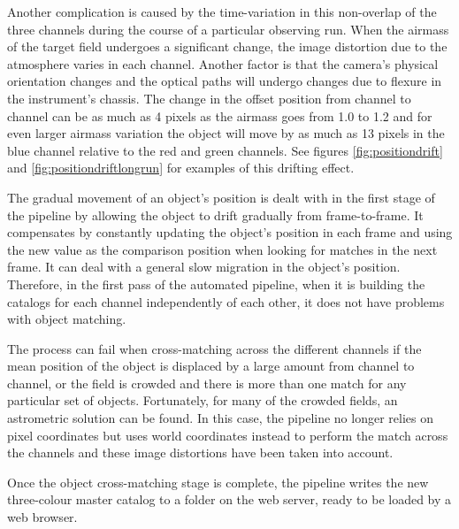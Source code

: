 Another complication is caused by the time-variation in this non-overlap of the three channels during the course of a particular observing run. When the airmass of the target field undergoes a significant change, the image distortion due to the atmosphere varies in each channel. Another factor is that the camera's physical orientation changes and the optical paths will undergo changes due to flexure in the instrument's chassis. The change in the offset position from channel to channel can be as much as 4 pixels as the airmass goes from 1.0 to 1.2 and for even larger airmass variation the object will move by as much as 13 pixels in the blue channel relative to the red and green channels. See figures \ref{fig:positiondrift} and \ref{fig:positiondriftlongrun} for examples of this drifting effect. 

The gradual movement of an object's position is dealt with in the first stage of the pipeline by allowing the object to drift gradually from frame-to-frame. It compensates by constantly updating the object's position in each frame and using the new value as the comparison position when looking for matches in the next frame. It can deal with a general slow migration in the object's position. Therefore, in the first pass of the automated pipeline, when it is building the catalogs for each channel independently of each other, it does not have problems with object matching. 

The process can fail when cross-matching across the different channels if the mean position of the object is displaced by a large amount from channel to channel, or the field is crowded and there is more than one match for any particular set of objects. Fortunately, for many of the crowded fields, an astrometric solution can be found. In this case, the pipeline  no longer relies on pixel coordinates but uses world coordinates instead to perform the match across the channels and these image distortions have been taken into account. 

Once the object cross-matching stage is complete, the pipeline writes the new three-colour master catalog to a folder on the web server, ready to be loaded by a web browser. 



